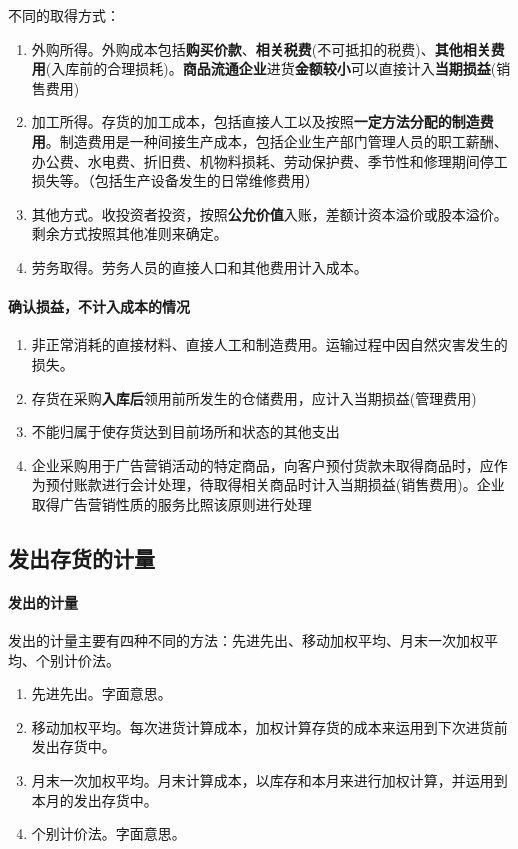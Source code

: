 \documentclass[UTF8,12pt]{ctexart}
\numberwithin{equation}{section} %
\numberwithin{figure}{section}
\numberwithin{table}{section}
\begin{document}
	不同的取得方式：
	\begin{enumerate}
		\item 外购所得。外购成本包括\textbf{购买价款}、\textbf{相关税费}(不可抵扣的税费)、\textbf{其他相关费用}(入库前的合理损耗)。\textbf{商品流通企业}进货\textbf{金额较小}可以直接计入\textbf{当期损益}(销售费用)
		
		\item 加工所得。存货的加工成本，包括直接人工以及按照\textbf{一定方法分配的制造费用}。制造费用是一种间接生产成本，包括企业生产部门管理人员的职工薪酬、办公费、水电费、折旧费、机物料损耗、劳动保护费、季节性和修理期间停工损失等。（包括生产设备发生的日常维修费用）
		
		\item 其他方式。收投资者投资，按照\textbf{公允价值}入账，差额计资本溢价或股本溢价。剩余方式按照其他准则来确定。
		
		\item 劳务取得。劳务人员的直接人口和其他费用计入成本。
	\end{enumerate}
	
	\paragraph{确认损益，不计入成本的情况}
	\begin{enumerate}
		\item 非正常消耗的直接材料、直接人工和制造费用。运输过程中因自然灾害发生的损失。
		
		\item 存货在采购\textbf{入库后}领用前所发生的仓储费用，应计入当期损益(管理费用)
		
		\item 不能归属于使存货达到目前场所和状态的其他支出
		
		\item 企业采购用于广告营销活动的特定商品，向客户预付货款未取得商品时，应作为预付账款进行会计处理，待取得相关商品时计入当期损益(销售费用)。企业取得广告营销性质的服务比照该原则进行处理 
	\end{enumerate}
	
	\subsection{发出存货的计量}
	\paragraph{发出的计量} 发出的计量主要有四种不同的方法：先进先出、移动加权平均、月末一次加权平均、个别计价法。
	\begin{enumerate}
		\item 先进先出。字面意思。
		
		\item 移动加权平均。每次进货计算成本，加权计算存货的成本来运用到下次进货前发出存货中。
		
		\item 月末一次加权平均。月末计算成本，以库存和本月来进行加权计算，并运用到本月的发出存货中。
		
		\item 个别计价法。字面意思。
	\end{enumerate}
	
\end{document}
